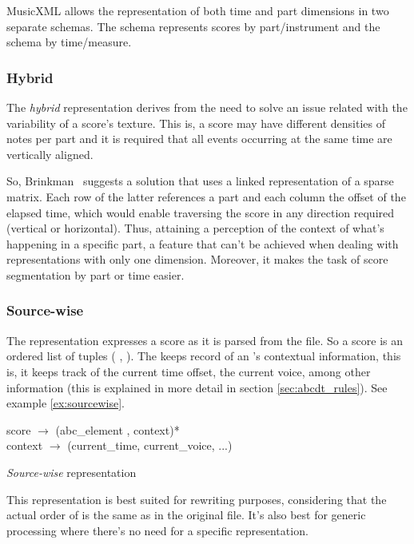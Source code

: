 MusicXML allows the representation of both time and part dimensions in two separate schemas. The
\partwise{} schema represents scores by part/instrument and the \timewise{} schema by time/measure.

\subsubsection{Hybrid}

The \emph{hybrid} representation derives from the need to solve an issue related with the
variability of a score's texture. This is, a score may have different densities of notes per part
and it is required that all events occurring at the same time are vertically aligned.

So, Brinkman~\cite{Brinkman1984} suggests a solution that uses a linked representation of a sparse
matrix. Each row of the latter references a part and each column the offset of the elapsed time,
which would enable traversing the score in any direction required (vertical or horizontal). Thus,
attaining a perception of the context of what's happening in a specific part, a feature that can't
be achieved when dealing with representations with only one dimension. Moreover, it makes the task
of score segmentation by part or time easier.

\subsubsection{Source-wise}

The \sourcewise{} representation expresses a score as it is parsed from the \abc{} file. So a score
is an ordered list of tuples (\abcelement{} , \context{}). The \context{} keeps record of an
\abcelement{}'s contextual information, this is, it keeps track of the current time offset, the
current voice, among other information (this \context{} is explained in more detail in section
\ref{sec:abcdt_rules}). See example \ref{ex:sourcewise}.

\begin{program}
  score $\rightarrow$ (abc\_element , context)*\\
  context $\rightarrow$ (current\_time, current\_voice, ...)
  \caption{\emph{Source-wise} representation}
  \label{ex:sourcewise}
\end{program}

This representation is best suited for rewriting purposes, considering that the actual order of
\abcelements{} is the same as in the original \abc{} file. It's also best for generic processing
where there's no need for a specific representation.


